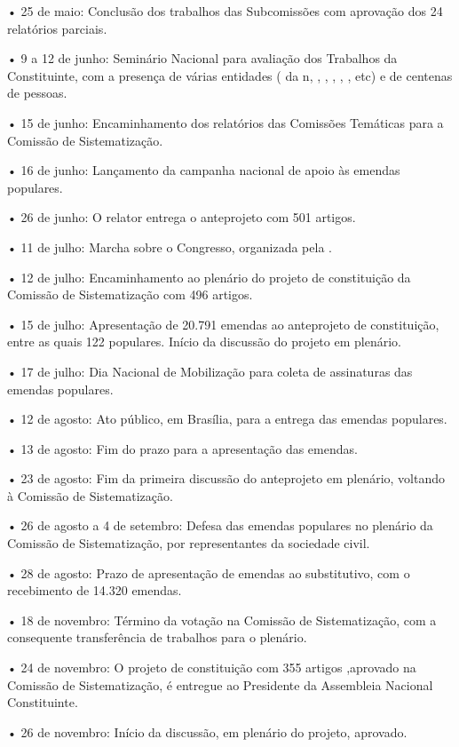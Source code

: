• 25 de maio: Conclusão dos trabalhos das Subcomissões com aprovação dos
24 relatórios parciais.

• 9 a 12 de junho: Seminário Nacional para avaliação dos Trabalhos da
Constituinte, com a presença de várias entidades ( da n, ,
, , , , etc) e de centenas de pessoas.

• 15 de junho: Encaminhamento dos relatórios das Comissões Temáticas
para a Comissão de Sistematização.

• 16 de junho: Lançamento da campanha nacional de apoio às emendas
populares.

• 26 de junho: O relator entrega o anteprojeto com 501 artigos.

• 11 de julho: Marcha sobre o Congresso, organizada pela .

• 12 de julho: Encaminhamento ao plenário do projeto de constituição da
Comissão de Sistematização com 496 artigos.

• 15 de julho: Apresentação de 20.791 emendas ao anteprojeto de
constituição, entre as quais 122 populares. Início da discussão do
projeto em plenário.

• 17 de julho: Dia Nacional de Mobilização para coleta de assinaturas
das emendas populares.

• 12 de agosto: Ato público, em Brasília, para a entrega das emendas
populares.

• 13 de agosto: Fim do prazo para a apresentação das emendas.

• 23 de agosto: Fim da primeira discussão do anteprojeto em plenário,
voltando à Comissão de Sistematização.

• 26 de agosto a 4 de setembro: Defesa das emendas populares no plenário
da Comissão de Sistematização, por representantes da sociedade civil.

• 28 de agosto: Prazo de apresentação de emendas ao substitutivo, com o
recebimento de 14.320 emendas.

• 18 de novembro: Término da votação na Comissão de Sistematização, com
a consequente transferência de trabalhos para o plenário.

• 24 de novembro: O projeto de constituição com 355 artigos ,aprovado na
Comissão de Sistematização, é entregue ao Presidente da Assembleia
Nacional Constituinte.

• 26 de novembro: Início da discussão, em plenário do projeto, aprovado.


